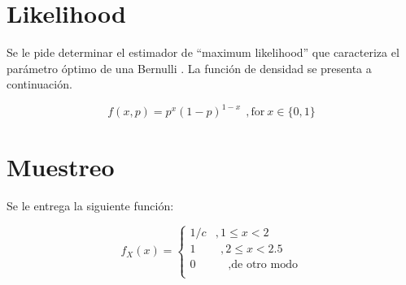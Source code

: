 \documentclass[11pt]{exam}
\begin{document}
\begin{questions}

\newpage
\section*{Likelihood}
\question Se le pide determinar el estimador de ``maximum likelihood'' que caracteriza el par\'ametro \'optimo de una Bernulli . La funci\'on de densidad se presenta a continuaci\'on.

\begin{equation}
f(x,p)=p^x(1-p)^{1-x} ~~,\text{for} ~x \in \{0,1\}  
\end{equation}

\newpage
\section*{Muestreo}
\question Se le entrega la siguiente funci\'on:

\begin{equation}
f_X(x) = \left\{\begin{matrix}
1/c & , 1\leq x < 2 \\ 
 1 & ~~, 2 \leq x < 2.5 \\
0&~~~~~, \text{de otro modo} \\
\end{matrix}\right.
\end{equation}


\end{questions}
\end{document}
